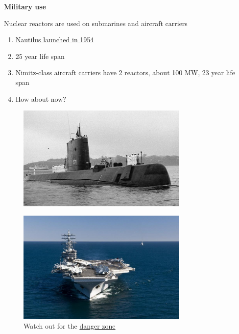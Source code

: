 \documentclass[aspectratio=1610,pdftex,dvipsnames,compress,xcolor={dvipsnames}]{beamer}
\begin{document}
\begin{frame}[plain]{}
    \centering\LARGE\textbf{Military use}
\end{frame}


\addtocounter{framenumber}{-1} 
\begin{frame}{Nuclear reactors are used on submarines and aircraft carriers}
    \begin{enumerate}[series=outerlist,topsep=0pt,itemsep=21pt,leftmargin=*,label=(\arabic*)]
        \item[]\href{https://www.independent.co.uk/life-style/history/a-day-that-shook-the-world-first-nuclear-submarine-launched-2189571.html}{Nautilus launched in 1954}
        \item[]25 year life span
        \item[]Nimitz-class aircraft carriers have 2 reactors, about 100 MW, 23 year life span
        \item[]How about now?
    \end{enumerate}
\end{frame}


\begin{frame}{}
    \begin{figure}
        \centering
        \includegraphics[width=0.75\textwidth]{nautilus.jpg}
    \end{figure}
\end{frame}


\begin{frame}{}
    \begin{figure}
        \centering
        \includegraphics[width=0.75\textwidth]{carrier.jpg}
        \caption*{Watch out for the \href{https://youtu.be/siwpn14IE7E}{danger zone}}
    \end{figure}
\end{frame}
\end{document}
